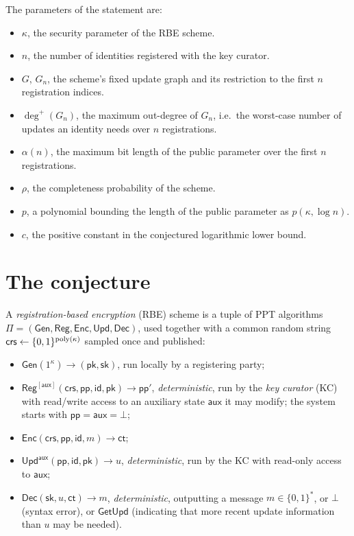 \documentclass{aicr-conjecture}
\newcommand{\Gen}{\mathsf{Gen}}
\newcommand{\Reg}{\mathsf{Reg}}
\newcommand{\Enc}{\mathsf{Enc}}
\newcommand{\Upd}{\mathsf{Upd}}
\newcommand{\Dec}{\mathsf{Dec}}
\newcommand{\pp}{\mathsf{pp}}
\newcommand{\aux}{\mathsf{aux}}
\newcommand{\crs}{\mathsf{crs}}
\newcommand{\pk}{\mathsf{pk}}
\newcommand{\sk}{\mathsf{sk}}
\newcommand{\id}{\mathsf{id}}
\newcommand{\ct}{\mathsf{ct}}
\newcommand{\GetUpd}{\mathsf{GetUpd}}
\newcommand{\outdeg}{\deg^{+}}
\begin{document}
\medskip
\noindent The parameters of the statement are:
\begin{itemize}
\item $\kappa$, the security parameter of the RBE scheme.
\item $n$, the number of identities registered with the key curator.
\item $G$, $G_n$, the scheme's fixed update graph and its restriction to
  the first $n$ registration indices.
\item $\outdeg(G_n)$, the maximum out-degree of $G_n$, i.e.\ the
  worst-case number of updates an identity needs over $n$
  registrations.
\item $\alpha(n)$, the maximum bit length of the public parameter over
  the first $n$ registrations.
\item $\rho$, the completeness probability of the scheme.
\item $p$, a polynomial bounding the length of the public parameter as
  $p(\kappa,\log n)$.
\item $c$, the positive constant in the conjectured logarithmic lower
  bound.
\end{itemize}

\section{The conjecture}\label{sec:conjectures}

\begin{definition}\label{def:rbe2}
A \emph{registration-based encryption} (RBE) scheme is a tuple of PPT
algorithms $\Pi = (\Gen, \Reg, \Enc, \Upd, \Dec)$, used together with a
common random string $\crs \sample \{0,1\}^{\poly(\kappa)}$ sampled once
and published:
\begin{itemize}
  \item $\Gen(1^{\kappa}) \to (\pk,\sk)$, run locally by a registering
    party;
  \item $\Reg^{[\aux]}(\crs,\pp,\id,\pk) \to \pp'$,
    \emph{deterministic}, run by the \emph{key curator} (KC) with
    read/write access to an auxiliary state $\aux$ it may modify; the
    system starts with $\pp = \aux = \bot$;
  \item $\Enc(\crs,\pp,\id,m) \to \ct$;
  \item $\Upd^{\aux}(\pp,\id,\pk) \to u$, \emph{deterministic}, run by
    the KC with read-only access to $\aux$;
  \item $\Dec(\sk,u,\ct) \to m$, \emph{deterministic}, outputting a
    message $m \in \{0,1\}^{*}$, or $\bot$ (syntax error), or $\GetUpd$
    (indicating that more recent update information than $u$ may be
    needed).
\end{itemize}
\end{definition}
\end{document}
